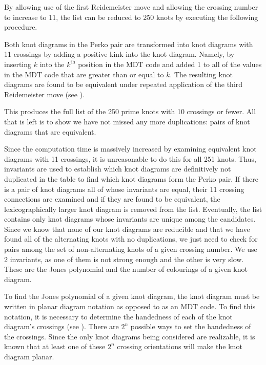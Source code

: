 \begin{paper}
By allowing use of the first Reidemeister move and allowing the crossing number
to increase to 11, the list can be reduced to 250 knots by executing the
following procedure.


Both knot diagrams in the Perko pair are transformed into knot diagrams with 11
crossings by adding a positive kink into the knot diagram.
Namely, by inserting $k$ into the $k^\text{th}$ position in the MDT code and
added 1 to all of the values in the MDT code that are greater than or equal to
$k$.
The resulting knot diagrams are found to be equivalent under repeated
application of the third Reidemeister move (see \figMoves).


This produces the full list of the 250 prime knots with 10 crossings or fewer.
All that is left is to show we have not missed any more duplications: pairs of
knot diagrams that are equivalent.


Since the computation time is massively increased by examining equivalent knot
diagrams with 11 crossings, it is unreasonable to do this for all 251 knots.
Thus, invariants are used to establish which knot diagrams are definitively not
duplicated in the table to find which knot diagrams form the Perko pair.
If there is a pair of knot diagrams all of whose invariants are equal, their 11
crossing connections are examined and if they are found to be equivalent, the
lexicographically larger knot diagram is removed from the list.
Eventually, the list contains only knot diagrams whose invariants are unique
among the candidates.
Since we know that none of our knot diagrams are reducible and that we have
found all of the alternating knots with no duplications, we just need to check
for pairs among the set of non-alternating knots of a given crossing number.
We use 2 invariants, as one of them is not strong enough and the other is very
slow.
These are the Jones polynomial and the number of colourings of a given knot
diagram.



To find the Jones polynomial of a given knot diagram, the knot diagram must be
written in planar diagram notation as opposed to as an MDT code.
To find this notation, it is necessary to determine the handedness of each of
the knot diagram's crossings (see \figCrossings).
There are $2^n$ possible ways to set the handedness of the crossings.
Since the only knot diagrams being considered are realizable, it is known that
at least one of these $2^n$ crossing orientations will make the knot diagram
planar.


\end{paper}
